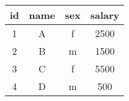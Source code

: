 \begin{tabular}{|c|c|c|c|}
    \hline
        \textbf{id} & \textbf{name} & \textbf{sex} & \textbf{salary} \\ \hline
        1 & A & f & 2500 \\ 
        2 & B & m & 1500 \\ 
        3 & C & f & 5500 \\ 
        4 & D & m & 500 \\ \hline
\end{tabular}
